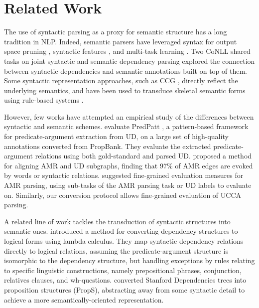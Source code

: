 \documentclass[11pt,a4paper]{article}
\begin{document}
\section{Related Work}\label{sec:related_work}

The use of syntactic parsing as a proxy for semantic structure has a long tradition in NLP.
Indeed, semantic parsers have leveraged syntax
for output space pruning \cite{xue2004calibrating}, 
syntactic features \cite{gildea2002automatic,N15-1007,E17-1045}, and
multi-task learning \cite{swayamdipta2016greedy,swayamdipta2018syntactic,strubell2018linguistically}.
Two CoNLL shared tasks on joint syntactic and semantic dependency parsing
\cite{surdeanu2008conll,hajivc2009conll}
explored the connection between syntactic dependencies and
semantic annotations built on top of them.
Some syntactic representation approaches, such as CCG \cite{Steedman:00},
directly reflect the underlying semantics, and have been used to
transduce skeletal semantic forms using rule-based systems \cite{Basile:12}.
  
However, few works have attempted an empirical study of
the differences between syntactic and semantic schemes. 
 evaluate PredPatt \citep{white2016universal},
a pattern-based framework for predicate-argument extraction from UD,
on a large set of high-quality annotations converted from PropBank.
They evaluate the extracted predicate-argument relations using both
gold-standard and parsed UD.
 proposed a method for aligning AMR
\cite{banarescu2013abstract} and UD subgraphs,
finding that 97\% of AMR edges are evoked by words or syntactic relations.
 suggested fine-grained evaluation measures
for AMR parsing, using sub-tasks of the AMR parsing task or UD labels to evaluate on.
Similarly, our conversion protocol allows fine-grained evaluation of UCCA parsing.

A related line of work tackles the transduction of syntactic structures into semantic ones.
 introduced a method for converting dependency
structures to logical forms using lambda calculus.
They map syntactic dependency relations directly to logical relations,
assuming the predicate-argument structure is isomorphic to the dependency structure,
but handling exceptions by rules relating to specific linguistic constructions,
namely prepositional phrases, conjunction, relatives clauses, and wh-questions.
 converted Stanford Dependencies trees into
proposition structures ({\sc PropS}), abstracting away from some syntactic detail to
achieve a more semantically-oriented representation.
\end{document}
